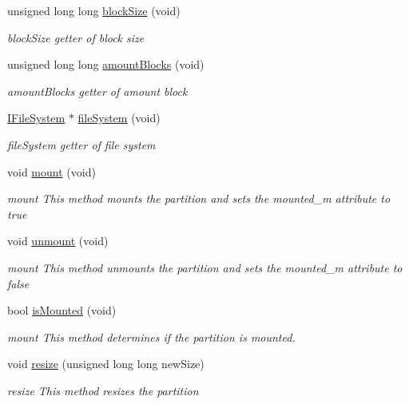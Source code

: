\begin{DoxyCompactItemize}
unsigned long long \mbox{\hyperlink{classlogic_1_1_partition_ad3fb03e884170c6068b6724f1121ecc6}{block\+Size}} (void)
\begin{DoxyCompactList}\small\item\em block\+Size getter of block size \end{DoxyCompactList}\item 
unsigned long long \mbox{\hyperlink{classlogic_1_1_partition_a28f8b672dccb67a06036e223be813950}{amount\+Blocks}} (void)
\begin{DoxyCompactList}\small\item\em amount\+Blocks getter of amount block \end{DoxyCompactList}\item 
\mbox{\hyperlink{class_i_file_system}{I\+File\+System}} $\ast$ \mbox{\hyperlink{classlogic_1_1_partition_a37dd86b3bc84bc1c7463beaf6d3adc57}{file\+System}} (void)
\begin{DoxyCompactList}\small\item\em file\+System getter of file system \end{DoxyCompactList}\item 
\mbox{\label{classlogic_1_1_partition_adeee9ac61d563134c5c1157d5e8d80d5}} 
void \mbox{\hyperlink{classlogic_1_1_partition_adeee9ac61d563134c5c1157d5e8d80d5}{mount}} (void)
\begin{DoxyCompactList}\small\item\em mount This method mounts the partition and sets the mounted\+\_\+m attribute to true \end{DoxyCompactList}\item 
\mbox{\label{classlogic_1_1_partition_adc87e31edb60281d230acdf4bd972848}} 
void \mbox{\hyperlink{classlogic_1_1_partition_adc87e31edb60281d230acdf4bd972848}{unmount}} (void)
\begin{DoxyCompactList}\small\item\em mount This method unmounts the partition and sets the mounted\+\_\+m attribute to false \end{DoxyCompactList}\item 
bool \mbox{\hyperlink{classlogic_1_1_partition_a2278f8791ff716985ea54bd61470d96f}{is\+Mounted}} (void)
\begin{DoxyCompactList}\small\item\em mount This method determines if the partition is mounted. \end{DoxyCompactList}\item 
void \mbox{\hyperlink{classlogic_1_1_partition_ab7b1a0f3847b9117a284cf4022e05e88}{resize}} (unsigned long long new\+Size)
\begin{DoxyCompactList}\small\item\em resize This method resizes the partition \end{DoxyCompactList}\end{DoxyCompactItemize}

